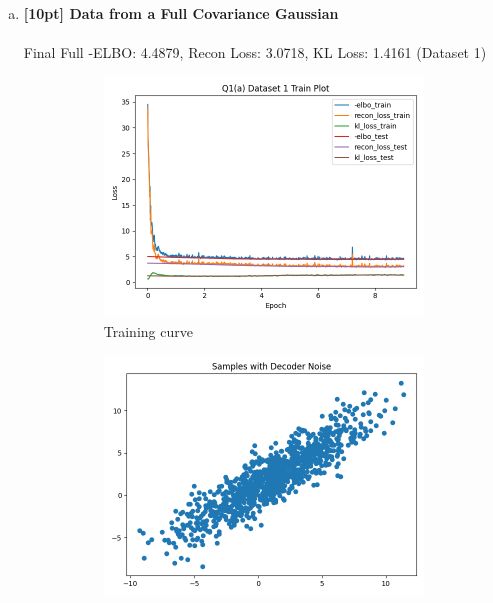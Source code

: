\documentclass{article}
\begin{document}
\begin{enumerate}[(a)]

\item {\bf [10pt] Data from a Full Covariance Gaussian} \\\\
Final Full -ELBO: 4.4879, Recon Loss: 3.0718, KL Loss: 1.4161 (Dataset 1)
\begin{figure}[H]
    \centering
    \begin{subfigure}{0.32\textwidth}
        \centering
        \includegraphics[width=\textwidth]{figures/q1_a_dset1_train_plot.png}
        \caption{Training curve}
    \end{subfigure}
    \begin{subfigure}{0.32\textwidth}
        \centering
        \includegraphics[width=\textwidth]{figures/q1_a_dset1_sample_with_noise.png}

\end{subfigure}
\end{figure}
\end{enumerate}
\end{document}
